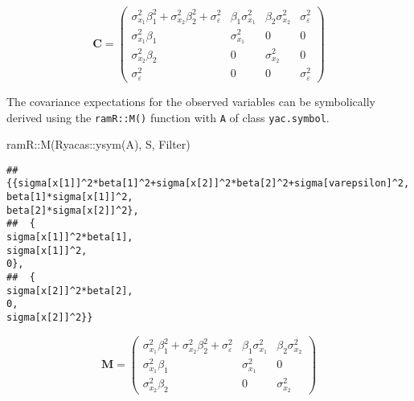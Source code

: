 \documentclass[
]{book}
\newenvironment{Shaded}{\begin{snugshade}}{\end{snugshade}}
\newcommand{\FunctionTok}[1]{\textcolor[rgb]{0.00,0.00,0.00}{#1}}
\newcommand{\NormalTok}[1]{#1}
\newcommand{\SpecialCharTok}[1]{\textcolor[rgb]{0.00,0.00,0.00}{#1}}
\theoremstyle{definition}
\theoremstyle{definition}
\theoremstyle{definition}
\theoremstyle{remark}
\begin{document}
\begin{equation*}\mathbf{C} =\left( \begin{array}{cccc} \sigma  _{x _{1}} ^{2} \beta  _{1} ^{2} + \sigma  _{x _{2}} ^{2} \beta  _{2} ^{2} + \sigma  _{\varepsilon } ^{2} & \beta  _{1} \sigma  _{x _{1}} ^{2} & \beta  _{2} \sigma  _{x _{2}} ^{2} & \sigma  _{\varepsilon } ^{2} \\ \sigma  _{x _{1}} ^{2} \beta  _{1} & \sigma  _{x _{1}} ^{2} & 0 & 0 \\ \sigma  _{x _{2}} ^{2} \beta  _{2} & 0 & \sigma  _{x _{2}} ^{2} & 0 \\ \sigma  _{\varepsilon } ^{2} & 0 & 0 & \sigma  _{\varepsilon } ^{2} \end{array} \right)\end{equation*}

The covariance expectations for the observed variables
can be symbolically derived using the \texttt{ramR::M()} function
with \texttt{A} of class \texttt{yac.symbol}.

\begin{Shaded}
\begin{Highlighting}[]
\NormalTok{ramR}\SpecialCharTok{::}\FunctionTok{M}\NormalTok{(Ryacas}\SpecialCharTok{::}\FunctionTok{ysym}\NormalTok{(A), S, Filter)}
\end{Highlighting}
\end{Shaded}

\begin{verbatim}
## {{sigma[x[1]]^2*beta[1]^2+sigma[x[2]]^2*beta[2]^2+sigma[varepsilon]^2,                                               beta[1]*sigma[x[1]]^2,                                               beta[2]*sigma[x[2]]^2},
##  {                                              sigma[x[1]]^2*beta[1],                                                       sigma[x[1]]^2,                                                                   0},
##  {                                              sigma[x[2]]^2*beta[2],                                                                   0,                                                       sigma[x[2]]^2}}
\end{verbatim}

\begin{equation*}\mathbf{M} =\left( \begin{array}{ccc} \sigma  _{x _{1}} ^{2} \beta  _{1} ^{2} + \sigma  _{x _{2}} ^{2} \beta  _{2} ^{2} + \sigma  _{\varepsilon } ^{2} & \beta  _{1} \sigma  _{x _{1}} ^{2} & \beta  _{2} \sigma  _{x _{2}} ^{2} \\ \sigma  _{x _{1}} ^{2} \beta  _{1} & \sigma  _{x _{1}} ^{2} & 0 \\ \sigma  _{x _{2}} ^{2} \beta  _{2} & 0 & \sigma  _{x _{2}} ^{2} \end{array} \right)\end{equation*}
\end{document}
